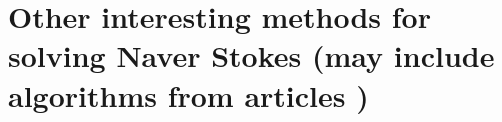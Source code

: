 \documentclass{article}
\begin{document}
%
%

\section{Other interesting methods for solving Naver Stokes (may include algorithms from articles \cite{Brown:2001, Dukowicz:1992, Kim:1985, Perot:1993})}
\end{document}
